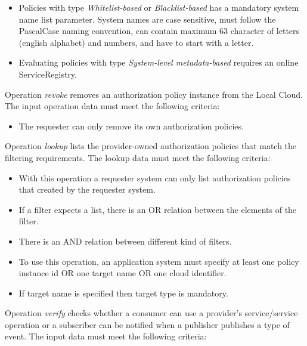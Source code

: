 \documentclass[a4paper]{arrowhead}
\begin{document}
\begin{itemize}
\begin{itemize}
        \end{itemize}
    \item Policies with type \textit{Whitelist-based} or \textit{Blacklist-based} has a mandatory system name list parameter. System names are case sensitive, must follow the PascalCase naming convention, can contain maximum 63 character of letters (english alphabet) and numbers, and have to start with a letter.
    \item Evaluating policies with type \textit{System-level metadata-based} requires an online ServiceRegistry.
\end{itemize}


Operation \textit{revoke} removes an authorization policy instance from the Local Cloud. The input operation data must meet the following criteria:

\begin{itemize}
    \item The requester can only remove its own authorization policies.
\end{itemize}


Operation \textit{lookup} lists the provider-owned authorization policies that match the filtering requirements. The lookup data must meet the following criteria:

\begin{itemize}
    \item With this operation a requester system can only list authorization policies that created by the requester system.
    \item If a filter expects a list, there is an OR relation between the elements of the filter.
    \item There is an AND relation between different kind of filters.
    \item To use this operation, an application system must specify at least one policy instance id OR one target name OR one cloud identifier.
    \item If target name is specified then target type is mandatory.
\end{itemize}


Operation \textit{verify} checks whether a consumer can use a provider's service/service operation or a subscriber can be notified when a publisher publishes a type of event. The input data must meet the following criteria:
\end{document}
